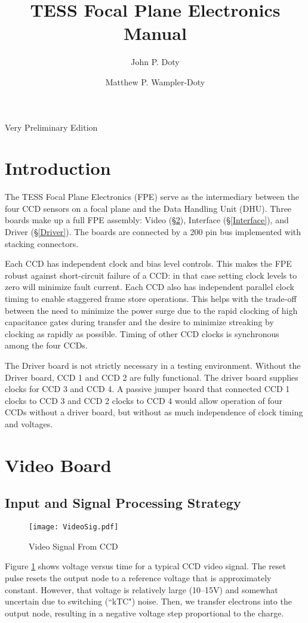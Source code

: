 \documentclass[12pt]{article}
\author{
John P. Doty \and Matthew P. Wampler-Doty
}
\title{TESS Focal Plane Electronics Manual}
\date{}
\let\oldsection\section
\renewcommand{\section}{\FloatBarrier\oldsection}
\let\oldsubsection\subsection
\renewcommand{\subsection}{\FloatBarrier\oldsubsection}
\begin{document}
\begin{titlepage}
\maketitle
\begin{center}
Very Preliminary Edition



\end{center}
\end{titlepage} 

\tableofcontents
\pagebreak

\section{Introduction}
The TESS Focal Plane Electronics (FPE) serve as the intermediary between the four CCD sensors on a focal plane and the Data Handling Unit (DHU). Three boards make up a full FPE assembly: Video (\S \ref{Video}), Interface (\S  \ref{Interface}), and Driver (\S \ref{Driver}). The boards are connected by a 200 pin bus implemented with stacking connectors. 

Each CCD has independent clock and bias level controls. This makes the FPE robust against short-circuit failure of a CCD: in that case setting clock levels to zero will minimize fault current. Each CCD also has independent parallel clock timing to enable staggered frame store operations. This helps with the trade-off between the need to minimize the power surge due to the rapid clocking of high capacitance gates during transfer and the desire to minimize streaking by clocking as rapidly as possible. Timing of other CCD clocks is synchronous among the four CCDs.

The Driver board is not strictly necessary in a testing environment. Without the Driver board, CCD 1 and CCD 2 are fully functional. The driver board supplies clocks for CCD 3 and CCD 4. A passive jumper board that connected CCD 1 clocks to CCD 3 and CCD 2 clocks to CCD 4 would allow operation of four CCDs without a driver board, but without as much independence of clock timing and voltages.

\section{Video Board}
\label{Video}
\subsection{Input and Signal Processing Strategy}
\begin{figure}[ht!]
\centerline{\texttt{[image: VideoSig.pdf]}}
 \caption{Video Signal From CCD}
 \label{VideoSig}
 \end{figure}
Figure \ref{VideoSig} shows voltage versus time for a typical CCD video signal. The reset pulse resets the output node to a reference voltage that is approximately constant. However, that voltage is relatively large (10--15V) and somewhat uncertain due to switching (``kTC") noise. Then, we transfer electrons into the output node, resulting in a negative voltage step proportional to the charge.
\end{document}

